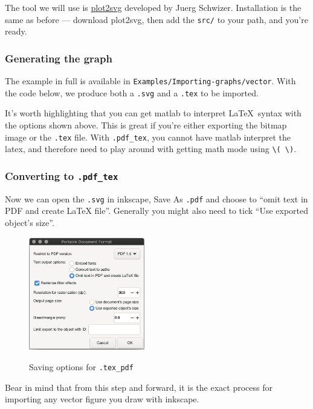The tool we will use is \href{https://uk.mathworks.com/matlabcentral/fileexchange/7401-scalable-vector-graphics-svg-export-of-figures}{plot2svg} developed by Juerg Schwizer.
Installation is the same as before --- download plot2svg, then add the \texttt{src/} to your path, and you're ready.

\subsubsection{Generating the graph}
The example in full is available in \texttt{Examples/Importing-graphs/vector}.
With the code below, we produce both a \texttt{.svg} and a \texttt{.tex} to be imported.



It's worth highlighting that you can get matlab to interpret \LaTeX\ syntax with the options shown above.
This is great if you're either exporting the bitmap image or the \texttt{.tex} file.
With \texttt{.pdf\_tex}, you cannot have matlab interpret the latex, and therefore need to play around with getting math mode using \verb|\( \)|.

\subsubsection{Converting to \texttt{.pdf\_tex}}
Now we can open the \texttt{.svg} in inkscape, Save As \texttt{.pdf} and choose to ``omit text in PDF and create LaTeX file''.
Generally you might also need to tick ``Use exported object's size''. 
\begin{figure}[h]
\centering
    \includegraphics[width=0.45\textwidth]{figures/latexpdf.png}
\label{fig:latexpdf}
\caption{Saving options for \texttt{.tex\_pdf}}
\end{figure}

Bear in mind that from this step and forward, it is the exact process for importing any vector figure you draw with inkscape.

